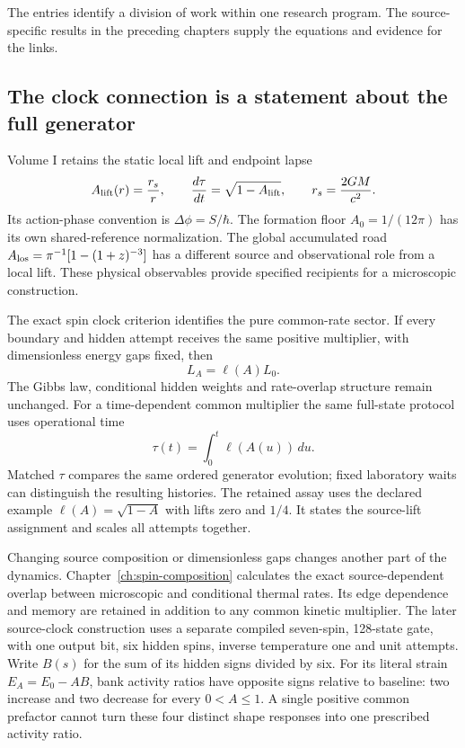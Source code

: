 The entries identify a division of work within one research program. The source-specific results in the preceding chapters supply the equations and evidence for the links.

\subsection{The clock connection is a statement about the full generator}

Volume I retains the static local lift and endpoint lapse
\begin{equation}
 A_{\rm lift}(r)=\frac{r_s}{r},\qquad
 \frac{d\tau}{dt}=\sqrt{1-A_{\rm lift}},
 \qquad r_s=\frac{2GM}{c^2}.
\end{equation}
Its action-phase convention is $\Delta\phi=S/\hbar$. The formation floor $A_0=1/(12\pi)$ has its own shared-reference normalization. The global accumulated road $A_{\rm los}=\pi^{-1}[1-(1+z)^{-3}]$ has a different source and observational role from a local lift. These physical observables provide specified recipients for a microscopic construction.

The exact spin clock criterion identifies the pure common-rate sector. If every boundary and hidden attempt receives the same positive multiplier, with dimensionless energy gaps fixed, then
\begin{equation}
 L_A=\ell(A)L_0.
\end{equation}
The Gibbs law, conditional hidden weights and rate-overlap structure remain unchanged. For a time-dependent common multiplier the same full-state protocol uses operational time
\begin{equation}
 \tau(t)=\int_0^t\ell(A(u))\,du.
\end{equation}
Matched $\tau$ compares the same ordered generator evolution; fixed laboratory waits can distinguish the resulting histories. The retained assay uses the declared example $\ell(A)=\sqrt{1-A}$ with lifts zero and $1/4$. It states the source-lift assignment and scales all attempts together.

Changing source composition or dimensionless gaps changes another part of the dynamics. Chapter~\ref{ch:spin-composition} calculates the exact source-dependent overlap between microscopic and conditional thermal rates. Its edge dependence and memory are retained in addition to any common kinetic multiplier. The later source-clock construction uses a separate compiled seven-spin, 128-state gate, with one output bit, six hidden spins, inverse temperature one and unit attempts. Write $B(s)$ for the sum of its hidden signs divided by six. For its literal strain $E_A=E_0-AB$, bank activity ratios have opposite signs relative to baseline: two increase and two decrease for every $0<A\leq1$. A single positive common prefactor cannot turn these four distinct shape responses into one prescribed activity ratio.

